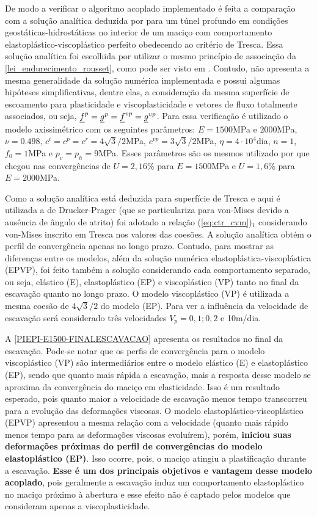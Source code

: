 De modo a verificar o algoritmo acoplado implementado é feita a comparação com a solução analítica deduzida por  para um túnel profundo em condições geostáticas-hidrostáticas no interior de um maciço com comportamento elastoplástico-viscoplástico perfeito obedecendo ao critério de Tresca. Essa solução analítica foi escolhida por utilizar o mesmo princípio de associação da \autoref{lei_endurecimento_rousset}, como pode ser visto em . Contudo, não apresenta a mesma generalidade da solução numérica implementada e possui algumas hipóteses simplificativas, dentre elas, a consideração da mesma superfície de escoamento para plasticidade e viscoplasticidade e vetores de fluxo totalmente associados, ou seja, $\underline f^p = \underline{g}^{p} = \underline f^{vp} = \underline{g}^{vp}$. Para essa verificação é utilizado o modelo axissimétrico com os seguintes parâmetros: $E=1500$MPa e $2000$MPa, $\nu=0.498$, $c^i=c^p=c^r =4\sqrt{3}/2$MPa, $c^{vp}=3\sqrt{3}/2$MPa, $\eta = 4 \cdot 10^4$dia, $n=1$, $f_0=1$MPa e $p_v=p_h=9$MPa. Esses parâmetros são os mesmos utilizado por  que chegou nas convergências de $U=2,16$\% para $E=1500$MPa e $U=1,6$\% para $E=2000$MPa.

Como a solução analítica está deduzida para superfície de Tresca e aqui é utilizada a de Drucker-Prager (que se particulariza para von-Mises devido a ausência de ângulo de atrito) foi adotado a relação (\ref{eq:ctr_cvm})$_1$ considerando von-Mises inscrito em Tresca nos valores das coesões. A solução analítica obtém o perfil de convergência apenas no longo prazo. Contudo, para mostrar as diferenças entre os modelos, além da solução numérica elastoplástica-viscoplástica (EPVP), foi feito também a solução considerando cada comportamento separado, ou seja, elástico (E), elastoplástico (EP) e viscoplástico (VP) tanto no final da escavação quanto no longo prazo. O modelo viscoplástico (VP) é utilizada a mesma coesão de $4\sqrt{3}/2$ do modelo (EP). Para ver a influência da velocidade de escavação será considerado três velocidades $V_p=0,1; 0,2$ e 10m/dia.

A \autoref{PIEPI-E1500-FINALESCAVACAO} apresenta os resultados no final da escavação. Pode-se notar que os perfis de convergência para o modelo viscoplástico (VP) são intermediários entre o modelo elástico (E) e elastoplástico (EP), sendo que quanto mais rápida a escavação, mais a resposta desse modelo se  aproxima da convergência do maciço em elasticidade. Isso é um resultado esperado, pois quanto maior a velocidade de escavação menos tempo transcorreu para a evolução das deformações viscosas. O modelo elastoplástico-viscoplástico (EPVP) apresentou a mesma relação com a velocidade (quanto mais rápido menos tempo para as deformações viscosas evoluírem), porém, \textbf{iniciou suas deformações próximas do perfil de convergências do modelo elastoplástico (EP)}. Isso ocorre, pois, o maciço atingiu a plastificação durante a escavação. \textbf{Esse é um dos principais objetivos e vantagem desse modelo acoplado}, pois geralmente a escavação induz um comportamento elastoplástico no maciço próximo à abertura e esse efeito não é captado pelos modelos que consideram apenas a viscoplasticidade.


